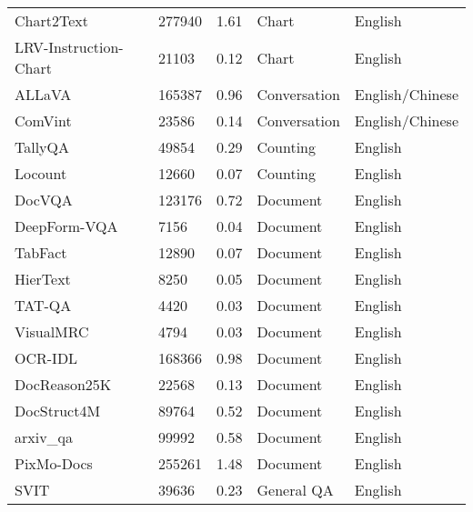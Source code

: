 \begin{table}[ht]
\begin{tabular}{l|l|l|l|l}
Chart2Text~\cite{kantharaj2022chart}               & 277940 & 1.61       & Chart        & English         \\
LRV-Instruction-Chart~\cite{liu2023aligning}       & 21103  & 0.12       & Chart        & English         \\
ALLaVA~\cite{chen2024allava}                       & 165387 & 0.96       & Conversation & English/Chinese \\
ComVint~\cite{du2023makes}                         & 23586  & 0.14       & Conversation & English/Chinese \\
TallyQA~\cite{acharya2019tallyqa}                  & 49854  & 0.29       & Counting     & English         \\
Locount~\cite{Cai2020Locount}                      & 12660  & 0.07       & Counting     & English         \\
DocVQA~\cite{mathew2020docvqa}                     & 123176 & 0.72       & Document     & English         \\
DeepForm-VQA~\cite{aggarwal2023dublin}             & 7156   & 0.04       & Document     & English         \\
TabFact~\cite{2019TabFactA}                        & 12890  & 0.07       & Document     & English         \\
HierText~\cite{long2022towards}                    & 8250   & 0.05       & Document     & English         \\
TAT-QA~\cite{zhu-etal-2021-tat}                    & 4420   & 0.03       & Document     & English         \\
VisualMRC~\cite{VisualMRC2021}                     & 4794   & 0.03       & Document     & English         \\
OCR-IDL~\cite{biten2022ocr}                        & 168366 & 0.98       & Document     & English         \\
DocReason25K~\cite{hu2024docowl}                   & 22568  & 0.13       & Document     & English         \\
DocStruct4M~\cite{hu2024docowl}                    & 89764  & 0.52       & Document     & English         \\
arxiv\_qa~\cite{li2024multimodalarxiv}        & 99992  & 0.58       & Document     & English         \\
PixMo-Docs~\cite{deitke2024molmo}                  & 255261 & 1.48       & Document     & English         \\
SVIT~\cite{zhao2023svit}                           & 39636  & 0.23       & General QA   & English         \\

\end{tabular}
\end{table}

